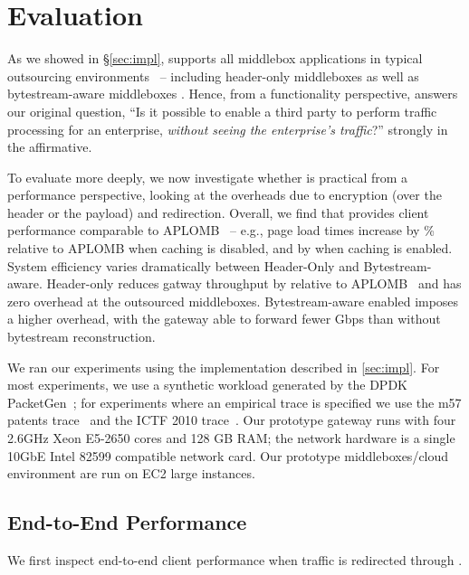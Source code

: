 
\section{Evaluation} \label{sec:eval}

As we showed in \S\ref{sec:impl}, \sys supports all middlebox applications in typical outsourcing environments~\cite{aplomb,nfv} -- including header-only middleboxes as well as bytestream-aware middleboxes . 
Hence, from a functionality perspective, \sys answers our original question, ``Is it possible to enable a third party to perform traffic processing for an enterprise, {\em without seeing the enterprise's traffic}?''  strongly in the affirmative.

To evaluate \sys more deeply, we now investigate whether \sys is practical from a performance perspective, looking at the overheads due to encryption (over the header or the payload) and redirection. 
Overall, we find that \sys provides client performance comparable to APLOMB~\cite{aplomb} -- e.g., page load times increase by \% relative to APLOMB when caching is disabled, and by  when caching is enabled.
System efficiency varies dramatically between Header-Only \sys and Bytestream-aware\sys.
Header-only \sys reduces gatway throughput by  relative to APLOMB~\cite{aplomb} and has zero overhead at the outsourced middleboxes. 
Bytestream-aware \sys enabled imposes a higher overhead, with the gateway able to forward  fewer Gbps than \sys without bytestream reconstruction.

We ran our experiments using the implementation described in \ref{sec:impl}. 
For most experiments, we use a synthetic workload generated by the DPDK PacketGen~\cite{pktgen}; for experiments where an empirical trace is specified we use the m57 patents trace~\cite{patents} and the ICTF 2010 trace~\cite{ictf}.
Our prototype gateway runs with four 2.6GHz Xeon E5-2650 cores and 128 GB RAM; the network hardware is a single 10GbE Intel 82599 compatible network card.
Our prototype middleboxes/cloud environment are run on EC2 large instances.
  

\subsection{End-to-End Performance}
We first inspect end-to-end client performance when traffic is redirected through \sys.


